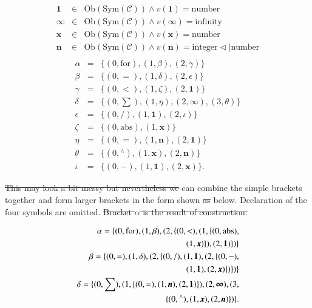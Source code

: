 \documentclass{aims}
\numberwithin{equation}{section}
\numberwithin{theorem}{section}	%
\numberwithin{axiom}{section}	%
\numberwithin{definition}{section}	%
\providecommand{\DIFadd}[1]{{\protect\color{blue}\uwave{#1}}} %
\providecommand{\DIFdel}[1]{{\protect\color{red}\sout{#1}}}                      %
\providecommand{\DIFaddbegin}{} %
\providecommand{\DIFaddend}{} %
\providecommand{\DIFdelbegin}{} %
\providecommand{\DIFdelend}{} %
\begin{document}
	\begin{equation*}
		\begin{aligned}
			\pmb{1} &\in& \text{Ob}(\text{Sym}(\mathcal{C}))\land \mathit{v}(\pmb{1})=\text{number}\\
			\pmb{\infty } &\in& \text{Ob}(\text{Sym}(\mathcal{C}))\land \mathit{v}(\pmb{\infty })=\text{infinity}\\
			\pmb{x} &\in& \text{Ob}(\text{Sym}(\mathcal{C}))\land \mathit{v}(\pmb{x})=\text{number}\\
			\pmb{n} &\in& \text{Ob}(\text{Sym}(\mathcal{C}))\land \mathit{v}(\pmb{n})=\text{integer}\triangleleft |\text{number}\\
		\end{aligned}
	\end{equation*}
	\begin{equation*}
		\begin{aligned}
			\alpha &=& \{(0,\text{for}),(1,\beta ),(2,\gamma )\}\\
			\beta &=& \{(0,=),(1,\delta ),(2,\epsilon )\}\\
			\gamma &=& \{(0,<),(1,\zeta ),(2,\pmb{1})\}\\
			\delta &=& \{(0,\sum ),(1,\eta ),(2,\pmb{\infty }), (3,\theta )\}\\
			\epsilon &=& \{(0,/),(1,\pmb{1}),(2,\iota )\}\\
			\zeta &=& \{(0,\text{abs}),(1,\pmb{x})\}\\
			\eta &=& \{(0,=),(1,\pmb{n}),(2,\pmb{1})\}\\
			\theta &=& \{(0,{}^{\wedge}),(1,\pmb{x}),(2,\pmb{n})\}\\
			\iota &=& \{(0,-),(1,\pmb{1}),(2,\pmb{x})\}.
		\end{aligned}
	\end{equation*}

	\DIFdelbegin \DIFdel{This may look a bit messy but nevertheless we }\DIFdelend \DIFaddbegin \DIFadd{We }\DIFaddend can combine the simple brackets together and form larger brackets in the form shown \DIFdelbegin \DIFdel{as }\DIFdelend below. Declaration of the four symbols are omitted.
	\DIFdelbegin \DIFdel{Bracket \(\alpha\) is the result of construction.
	}\DIFdelend 

	\begin{equation}
		\begin{split}
			\alpha = \{(0,\text{for}),(1,\beta ),(2,\{(0,<),(1,\{(0,\text{abs}),\\(1,\pmb{x})\}),(2,\pmb{1})\})\}\hfill\\
			\beta = \{(0,=),(1,\delta ),(2,\{(0,/),(1,\pmb{1}),(2,\{(0,-),\\(1,\pmb{1}),(2,\pmb{x})\})\})\}\hfill\\
			\delta = \{(0,\sum ),(1,\{(0,=),(1,\pmb{n}),(2,\pmb{1})\}),(2,\pmb{\infty }), (3,\\\{(0,{}^{\wedge}),(1,\pmb{x}),(2,\pmb{n})\})\}.\hfill\\
		\end{split}
	\end{equation}
\end{document}

